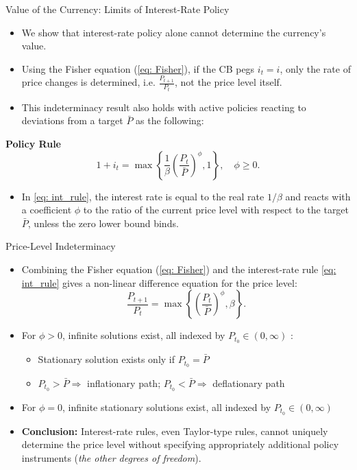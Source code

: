 \documentclass[11pt,aspectratio=169]{beamer}
\begin{document}
\begin{frame}{Value of the Currency: Limits of Interest-Rate Policy}
\begin{itemize}
    \item We show that interest-rate policy alone cannot determine the currency's value.
    \item Using the Fisher equation (\ref{eq: Fisher}), if the CB pegs $i_t = i$, only the rate of price changes is determined, i.e. $\frac{P_{t+1}}{P_{t}}$, not the price level itself.
    \item This indeterminacy result also holds with active policies reacting to deviations from a target $\bar{P}$ as the following:
\end{itemize}
\textbf{Policy Rule}
    \begin{equation} \label{eq: int_rule}
        1 + i_t = \max \left\{ \frac{1}{\beta} \left( \frac{P_t}{\bar{P}} \right)^\phi, 1 \right\}, \quad \phi \ge 0.
    \end{equation}
\begin{itemize}
    \item In \eqref{eq: int_rule}, the interest rate is equal to the real rate $1/\beta$ and reacts with a coefficient $\phi$ to the ratio of the current price level with respect to the target $\bar{P}$, unless the zero lower bound binds.
\end{itemize}
\end{frame}

\begin{frame}{Price-Level Indeterminacy}
\begin{itemize}
    \item Combining the Fisher equation (\ref{eq: Fisher}) and the interest-rate rule \eqref{eq: int_rule} gives a non-linear difference equation for the price level:
    \begin{equation} \label{eq: price_level_rule}
        \frac{P_{t+1}}{P_t} = \max \left\{ \left(\frac{P_t}{\bar{P}} \right)^\phi, \beta \right\}.
    \end{equation}
    \item For $\phi > 0$, infinite solutions exist, all indexed by $P_{t_0} \in (0,\infty)$ :
    \begin{itemize}
        \item Stationary solution exists only if $P_{t_0} = \bar{P}$
        \item $P_{t_0} > \bar{P} \Rightarrow $  inflationary path;  
        $P_{t_0} < \bar{P}\Rightarrow $  deflationary path
        \end{itemize}
    \item For $\phi = 0$, infinite stationary solutions exist, all indexed by $P_{t_0} \in (0,\infty)$
    \item \textbf{Conclusion:} Interest-rate rules, even Taylor-type rules, cannot uniquely determine the price level without specifying appropriately additional policy instruments (\textit{the other degrees of freedom}).
\end{itemize}
\end{frame}
\end{document}
